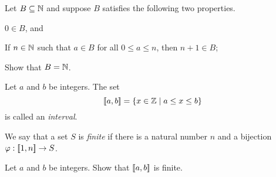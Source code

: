 \begin{exercise}
Let \(B \subseteq \mathbb{N}\) and suppose \(B\) satisfies the following two properties.
\begin{proplist}
\item \(0 \in B\), and
\item If \(n \in \mathbb{N}\) such that \(a \in B\) for all \(0 \leq a \leq n\), then \(n+1 \in B\);
\end{proplist}
Show that \(B = \mathbb{N}\).
\end{exercise}

\begin{dfn}
Let \(a\) and \(b\) be integers.
The set \[ [\![a,b]\!] = \{ x \in \mathbb{Z} \mid a \leq x \leq b \} \] is called an \emph{interval}.
\end{dfn}

\begin{dfn}[Finite]
We say that a set \(S\) is \emph{finite} if there is a natural number \(n\) and a bijection \(\varphi : [\![1,n]\!] \rightarrow S\).
\end{dfn}

\begin{exercise}
Let \(a\) and \(b\) be integers.
Show that \([\![a,b]\!]\) is finite.
\end{exercise}
